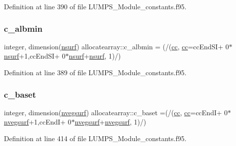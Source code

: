 Definition at line 390 of file L\+U\+M\+P\+S\+\_\+\+Module\+\_\+constants.\+f95.

\mbox{\label{namespaceallocatearray_a91ee5bc5a0b80fc80743025448cf3317}} 
\subsubsection{\texorpdfstring{c\+\_\+albmin}{c\_albmin}}
{\footnotesize\ttfamily integer, dimension(\hyperlink{namespaceallocatearray_acd22f92a06f7e9a2a91426b3dc99fdb0}{nsurf}) allocatearray\+::c\+\_\+albmin = (/(\hyperlink{namespaceallocatearray_ac863c81704eb507dee10f5e10741e10c}{cc}, \hyperlink{namespaceallocatearray_ac863c81704eb507dee10f5e10741e10c}{cc}=cc\+End\+SI+ 0$\ast$\hyperlink{namespaceallocatearray_acd22f92a06f7e9a2a91426b3dc99fdb0}{nsurf}+1,cc\+End\+SI+ 0$\ast$\hyperlink{namespaceallocatearray_acd22f92a06f7e9a2a91426b3dc99fdb0}{nsurf}+\hyperlink{namespaceallocatearray_acd22f92a06f7e9a2a91426b3dc99fdb0}{nsurf}, 1)/)}



Definition at line 389 of file L\+U\+M\+P\+S\+\_\+\+Module\+\_\+constants.\+f95.

\mbox{\label{namespaceallocatearray_aae3a05a05214369ae0e7293efe27aded}} 
\subsubsection{\texorpdfstring{c\+\_\+baset}{c\_baset}}
{\footnotesize\ttfamily integer, dimension(\hyperlink{namespaceallocatearray_abb987c3b35dd321963fd53d38f10236f}{nvegsurf}) allocatearray\+::c\+\_\+baset =(/(\hyperlink{namespaceallocatearray_ac863c81704eb507dee10f5e10741e10c}{cc}, \hyperlink{namespaceallocatearray_ac863c81704eb507dee10f5e10741e10c}{cc}=cc\+EndI+ 0$\ast$\hyperlink{namespaceallocatearray_abb987c3b35dd321963fd53d38f10236f}{nvegsurf}+1,cc\+EndI+ 0$\ast$\hyperlink{namespaceallocatearray_abb987c3b35dd321963fd53d38f10236f}{nvegsurf}+\hyperlink{namespaceallocatearray_abb987c3b35dd321963fd53d38f10236f}{nvegsurf}, 1)/)}



Definition at line 414 of file L\+U\+M\+P\+S\+\_\+\+Module\+\_\+constants.\+f95.

